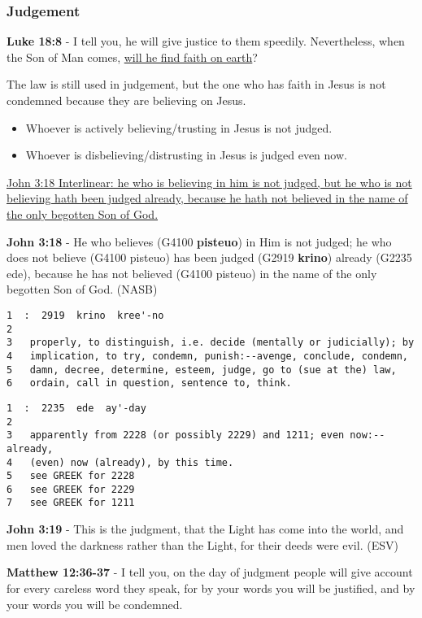 \documentclass[11pt]{article}
\begin{document}
\subsubsection{Judgement}
\label{sec:orgc818ffe}
\textbf{Luke 18:8} - I tell you, he will give justice to them speedily. Nevertheless, when the Son of Man comes, \uline{will he find faith on earth}?

The law is still used in judgement, but the one who has faith in Jesus is not condemned because they are believing on Jesus.

\begin{itemize}
\item Whoever is actively believing/trusting in Jesus is not judged.
\item Whoever is disbelieving/distrusting in Jesus is judged even now.
\end{itemize}

\href{https://biblehub.com/interlinear/john/3-18.htm}{John 3:18 Interlinear: he who is believing in him is not judged, but he who is not believing hath been judged already, because he hath not believed in the name of the only begotten Son of God.}

\textbf{John 3:18} - He who believes (G4100 \textbf{pisteuo}) in Him is not judged; he who does not believe (G4100 pisteuo) has been judged (G2919 \textbf{krino}) already (G2235 ede), because he has not believed (G4100 pisteuo) in the name of the only begotten Son of God. (NASB)

\begin{verbatim}
1  :  2919  krino  kree'-no
2  
3   properly, to distinguish, i.e. decide (mentally or judicially); by
4   implication, to try, condemn, punish:--avenge, conclude, condemn,
5   damn, decree, determine, esteem, judge, go to (sue at the) law,
6   ordain, call in question, sentence to, think.
\end{verbatim}

\begin{verbatim}
1  :  2235  ede  ay'-day
2  
3   apparently from 2228 (or possibly 2229) and 1211; even now:--already,
4   (even) now (already), by this time.
5   see GREEK for 2228
6   see GREEK for 2229
7   see GREEK for 1211
\end{verbatim}

\textbf{John 3:19} - This is the judgment, that the Light has come into the world, and men loved the darkness rather than the Light, for their deeds were evil. (ESV)

\textbf{Matthew 12:36-37} - I tell you, on the day of judgment people will give account for every careless word they speak, for by your words you will be justified, and by your words you will be condemned.
\end{document}
